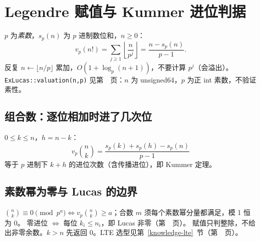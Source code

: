 \section{Legendre 赋值与 Kummer 进位判据}\label{knowledge-valuations}
$p$ 为\emph{素数}，$s_p(n)$ 为 $p$ 进制数位和，$n\ge0$：
\[
 v_p(n!)=\sum_{j\ge1}\left\lfloor\frac n{p^j}\right\rfloor
        =\frac{n-s_p(n)}{p-1}.
\]
反复 $n\gets\lfloor n/p\rfloor$ 累加，$O(1+\log_p(n+1))$，不要计算 $p^j$（会溢出）。
\texttt{ExLucas::valuation(n,p)} 见第~\pageref{compact-ExLucas}~页：$n$ 为 unsigned64，$p$ 为正 int 素数，不验证素性。

\subsection{组合数：逐位相加时进了几次位}
$0\le k\le n$，$h=n-k$：
\[
 v_p\binom nk=\frac{s_p(k)+s_p(h)-s_p(n)}{p-1}
\]
等于 $p$ 进制下 $k+h$ 的进位次数（含传播进位），即 Kummer 定理。

\subsection{素数幂为零与 Lucas 的边界}
$\binom nk\equiv0\pmod{p^a}\Longleftrightarrow v_p\binom nk\ge a$；合数 $m$ 须每个素数幂分量都满足，模 1 恒为 0。
零进位 $\Longleftrightarrow$ 每位 $k_i\le n_i$，即 Lucas 非零（第~\pageref{compact-Lucas}~页）。
赋值只判整除，不给出非零余数。$k>n$ 先返回 0。LTE 选型见第~\ref{knowledge-lte}~节（第~\pageref{knowledge-lte}~页）。
